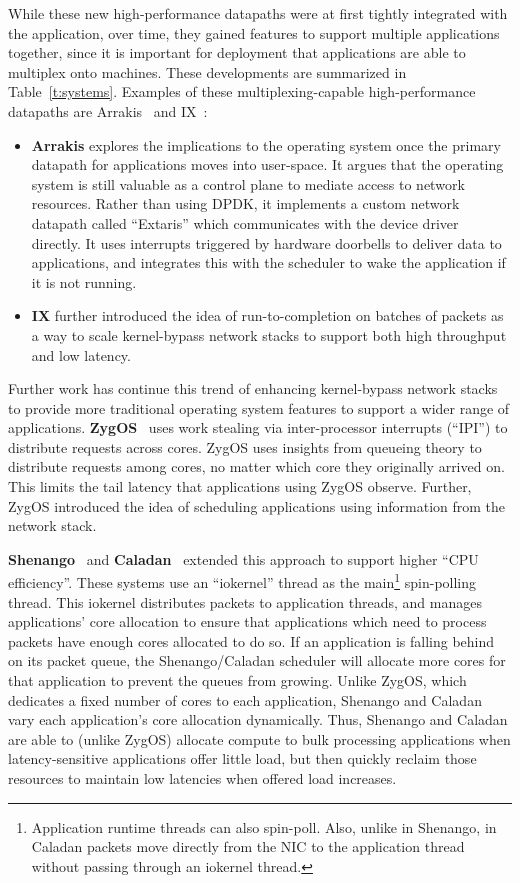 While these new high-performance datapaths were at first tightly integrated with the application, over time, they gained features to support multiple applications together, since it is important for deployment that applications are able to multiplex onto machines. These developments are summarized in Table~\ref{t:systems}. Examples of these multiplexing-capable high-performance datapaths are Arrakis~\cite{arrakis} and IX~\cite{ix}:
\begin{itemize}
\item \textbf{Arrakis} explores the implications to the operating system once the primary datapath for applications moves into user-space. It argues that the operating system is still valuable as a control plane to mediate access to network resources. Rather than using DPDK, it implements a custom network datapath called ``Extaris'' which communicates with the device driver directly. 
It uses interrupts triggered by hardware doorbells to deliver data to applications, and integrates this with the scheduler to wake the application if it is not running.
\item \textbf{IX} further introduced the idea of run-to-completion on batches of packets as a way to scale kernel-bypass network stacks to support both high throughput and low latency.
\end{itemize}

Further work has continue this trend of enhancing kernel-bypass network stacks to provide more traditional operating system features to support a wider range of applications.
\textbf{ZygOS}~\cite{zygos} uses work stealing via inter-processor interrupts (``IPI'') to distribute requests across cores. ZygOS uses insights from queueing theory to distribute requests among cores, no matter which core they originally arrived on. This limits the tail latency that applications using ZygOS observe. Further, ZygOS introduced the idea of scheduling applications using information from the network stack.

\textbf{Shenango}~\cite{shenango} and \textbf{Caladan}~\cite{caladan} extended this approach to support higher ``CPU efficiency''. These systems use an ``iokernel'' thread as the main\footnote{Application runtime threads can also spin-poll. Also, unlike in Shenango, in Caladan packets move directly from the NIC to the application thread without passing through an iokernel thread.} spin-polling thread. 
This iokernel distributes packets to application threads, and manages applications' core allocation to ensure that applications which need to process packets have enough cores allocated to do so.
If an application is falling behind on its packet queue, the Shenango/Caladan scheduler will allocate more cores for that application to prevent the queues from growing.
Unlike ZygOS, which dedicates a fixed number of cores to each application, Shenango and Caladan vary each application's core allocation dynamically.
Thus, Shenango and Caladan are able to (unlike ZygOS) allocate compute to bulk processing applications when latency-sensitive applications offer little load, but then quickly reclaim those resources to maintain low latencies when offered load increases.

